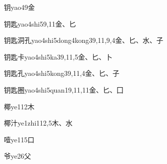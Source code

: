 \begin{EntryWithPhonetic}{钥}{yao4}{9}{⾦}
\end{EntryWithPhonetic}

\begin{EntryWithPhonetic}{钥匙}{yao4shi5}{9,11}{⾦、⼔}
\end{EntryWithPhonetic}

\begin{EntryWithPhonetic}{钥匙洞孔}{yao4shi5dong4kong3}{9,11,9,4}{⾦、⼔、⽔、⼦}
\end{EntryWithPhonetic}

\begin{EntryWithPhonetic}{钥匙卡}{yao4shi5ka3}{9,11,5}{⾦、⼔、⼘}
\end{EntryWithPhonetic}

\begin{EntryWithPhonetic}{钥匙孔}{yao4shi5kong3}{9,11,4}{⾦、⼔、⼦}
\end{EntryWithPhonetic}

\begin{EntryWithPhonetic}{钥匙圈}{yao4shi5quan1}{9,11,11}{⾦、⼔、⼞}
\end{EntryWithPhonetic}

\begin{EntryWithPhonetic}{椰}{ye1}{12}{⽊}
\end{EntryWithPhonetic}

\begin{EntryWithPhonetic}{椰汁}{ye1zhi1}{12,5}{⽊、⽔}
\end{EntryWithPhonetic}

\begin{EntryWithPhonetic}{噎}{ye1}{15}{⼝}
\end{EntryWithPhonetic}

\begin{EntryWithPhonetic}{爷}{ye2}{6}{⽗}
\end{EntryWithPhonetic}

